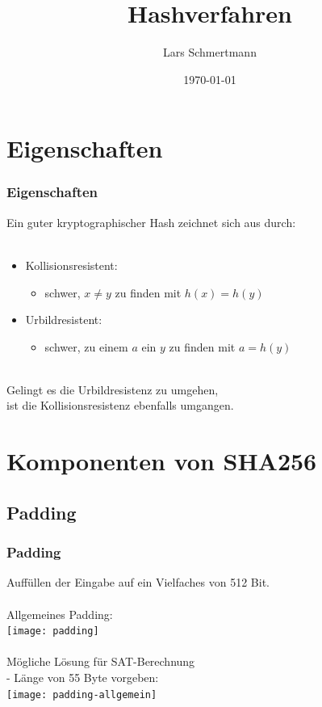 \documentclass{beamer}
\title{Hashverfahren}
\author{Lars Schmertmann}
\date{\today}
\begin{document}
\maketitle


\section{Eigenschaften}
  \begin{frame}
    \frametitle{Eigenschaften}
    Ein guter kryptographischer Hash zeichnet sich aus durch:\\
    ~\\
    \begin{itemize}
      \setlength{\itemsep}{20pt}
      \item Kollisionsresistent:
      \begin{itemize}
        \item schwer, $ x \neq y $ zu finden mit $ h(x) = h(y) $
      \end{itemize}
      \item Urbildresistent:
      \begin{itemize}
        \item schwer, zu einem $ a $ ein $ y $ zu finden mit $ a = h(y) $
      \end{itemize}
    \end{itemize}
    ~\\
    Gelingt es die Urbildresistenz zu umgehen,\\
    ist die Kollisionsresistenz ebenfalls umgangen.
  \end{frame}

\section{Komponenten von SHA256}
\subsection{Padding}
  \begin{frame}
    \frametitle{Padding}
    Auffüllen der Eingabe auf ein Vielfaches von 512 Bit.\\
    ~\\
    Allgemeines Padding:\\
    \texttt{[image: padding]}\\
    \pause~\\
    Mögliche Lösung für SAT-Berechnung\\
    - Länge von 55 Byte vorgeben:\\
    \texttt{[image: padding-allgemein]}
  \end{frame}
\end{document}
